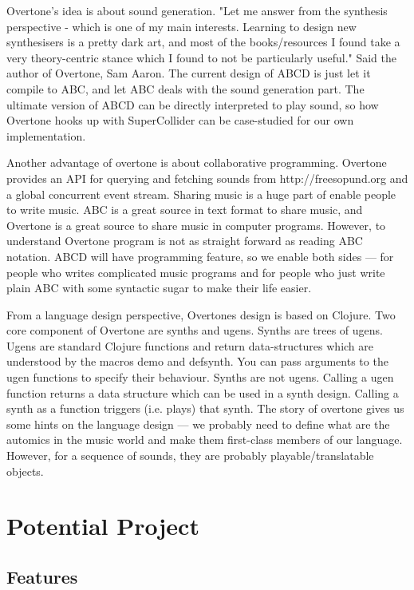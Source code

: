 Overtone's idea is about sound generation. "Let me answer from the synthesis perspective - which is one of my main interests. Learning to design new synthesisers is a pretty dark art, and most of the books/resources I found take a very theory-centric stance which I found to not be particularly useful." Said the author of Overtone, Sam Aaron\cite{Aaron13}. The current design of ABCD is just let it compile to ABC, and let ABC deals with the sound generation part. The ultimate version of ABCD can be directly interpreted to play sound, so how Overtone hooks up with SuperCollider can be case-studied for our own implementation.

Another advantage of overtone is about collaborative programming. Overtone provides an API for querying and fetching sounds from http://freesopund.org and a global concurrent event stream\cite{Aaron16}. Sharing music is a huge part of enable people to write music. ABC is a great source in text format to share music, and Overtone is a great source to share music in computer programs. However, to understand Overtone program is not as straight forward as reading ABC notation. ABCD will have programming feature, so we enable both sides --- for people who writes complicated music programs and for people who just write plain ABC with some syntactic sugar to make their life easier.

From a language design perspective, Overtones design is based on Clojure. Two core component of Overtone are synths and ugens. Synths are trees of ugens. Ugens are standard Clojure functions and return data-structures which are understood by the macros demo and defsynth. You can pass arguments to the ugen functions to specify their behaviour. Synths are not ugens. Calling a ugen function returns a data structure which can be used in a synth design. Calling a synth as a function triggers (i.e. plays) that synth.\cite{Aaron14} The story of overtone gives us some hints on the language design --- we probably need to define what are the automics in the music world and make them first-class members of our language. However, for a sequence of sounds, they are probably playable/translatable objects.


\section{Potential Project}

\subsection{Features}
